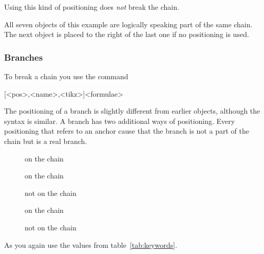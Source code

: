 \documentclass[toc=index,DIV10]{cnpkgdoc}
\begin{document}
Using this kind of positioning does \emph{not} break the chain.
\begin{beispiel}
 \begin{rxn}
  \arrow{}{}
  \arrow[a.-90]{}{}
  \arrow[a.180]{}{}
 \end{rxn}
\end{beispiel}

All seven objects of this example are logically speaking part of the same chain.
The next object is placed to the right of the last one if no positioning is used.
\begin{rxn}
 \arrow[,,,pa]{}{}
 \arrow[a.-90,,,pb]{}{}
 \arrow[a.180,,,pc]{}{}
\end{rxn}

\subsubsection{Branches}
To break a chain you use the command
\begin{beschreibung}
 [<pos>,<name>,<tikz>]{<formulae>}
\end{beschreibung}
The positioning of a branch is slightly different from earlier objects, although
the syntax is similar. A branch has two additional ways of positioning. Every
positioning that refers to an anchor cause that the branch is not a part of the
chain but is a real branch.
\begin{description}
 \item[] on the chain
 \item[] on the chain
 \item[] not on the chain
 \item[]on the chain
 \item[] not on the chain
\end{description}
As  you again use the values from table~\ref{tab:keywords}.

\begin{beispiel}
 \begin{rxn}
  \arrow{}{}
  \arrow{}{}
 \end{rxn}
\end{beispiel}
\end{document}
